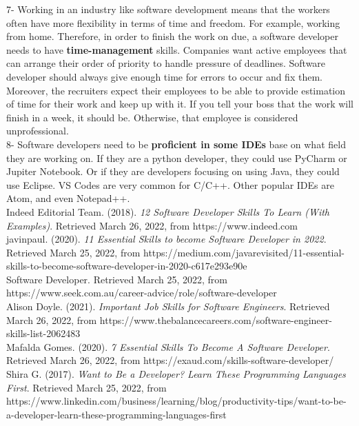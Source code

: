 \documentclass[a4paper, 11pt]{report}
\begin{document}
7- Working in an industry like software development means that the workers often have more flexibility in terms of time and freedom. For example, working from home. Therefore, in order to finish the work on due, a software developer needs to have \textbf{time-management} skills. Companies want active employees that can arrange their order of priority to handle pressure of deadlines. Software developer should always give enough time for errors to occur and fix them. Moreover, the recruiters expect their employees to be able to provide estimation of time for their work and keep up with it. If you tell your boss that the work will finish in a week, it should be. Otherwise, that employee is considered unprofessional.\\

8- Software developers need to be \textbf{proficient in some IDEs} base on what field they are working on. If they are a python developer, they could use PyCharm or Jupiter Notebook. Or if they are developers focusing on using Java, they could use Eclipse. VS Codes are very common for C/C++. Other popular IDEs are Atom, and even Notepad++.\\

Indeed Editorial Team. (2018). \textit{12 Software Developer Skills To Learn (With Examples)}. Retrieved March 26, 2022, from https://www.indeed.com\\

javinpaul. (2020). \textit{11 Essential Skills to become Software Developer in 2022}. Retrieved March 25, 2022, from https://medium.com/javarevisited/11-essential-skills-to-become-software-developer-in-2020-c617e293e90e\\

Software Developer. Retrieved March 25, 2022, from https://www.seek.com.au/career-advice/role/software-developer\\

Alison Doyle. (2021). \textit{Important Job Skills for Software Engineers}. Retrieved March 26, 2022, from https://www.thebalancecareers.com/software-engineer-skills-list-2062483\\

Mafalda Gomes. (2020). \textit{7 Essential Skills To Become A Software Developer}. Retrieved March 26, 2022, from https://exaud.com/skills-software-developer/\\

Shira G. (2017). \textit{Want to Be a Developer? Learn These Programming Languages First}. Retrieved March 25, 2022, from https://www.linkedin.com/business/learning/blog/productivity-tips/want-to-be-a-developer-learn-these-programming-languages-first\\
\end{document}
